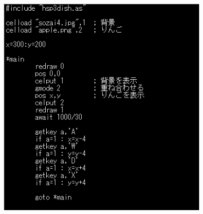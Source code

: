 \documentclass[a4paper,dvipdfmx]{jarticle}
\begin{document}
\bigskip



\begin{center}
\includegraphics[width=10.61cm,height=11.229cm]{text04-img/text04-img037.png}

\end{center}

\bigskip


\bigskip


\bigskip


\bigskip


\bigskip


\bigskip


\bigskip


\bigskip


\bigskip


\bigskip


\bigskip


\bigskip


\bigskip


\bigskip


\bigskip


\bigskip


\bigskip


\bigskip


\bigskip


\bigskip


\bigskip


\bigskip


\bigskip
\end{document}
